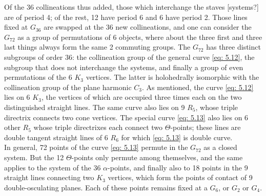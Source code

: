 \documentclass[leqno]{article}
\begin{document}
Of the 36 collineations thus added, those which interchange the staves [systems?] are of period 4; of the rest, 12 have period 6 and 6 have period 2. Those lines fixed at $G_{36}$ are swapped at the 36 new collineations, and one can consider the $G_{72}$ as a group of permutations of 6 objects, where about the three first and three last things always form the same 2 commuting groups. The $G_{72}$ has three distinct subgroups of order 36: the collineation group of the general curve \eqref{eq: 5.12}, the subgroup that does not interchange the systems, and finally a group of even permutations of the 6 $K_3$ vertices. The latter is holohedrally isomorphic with the collineation group of the plane harmonic $C_3$. As mentioned, the curve \eqref{eq: 5.12} lies on 6 $K_3$, the vertices of which are occupied three times each on the two distinguished straight lines. The same curve also lies on 9 $R_5$, whose triple directrix connects two cone vertices. The special curve \eqref{eq: 5.13} also lies on 6 other $R_5$ whose triple directrixes each connect two $\Theta$-points; these lines are double tangent straight lines of 6 $R_6$ for which \eqref{eq: 5.13} is double curve. \\
In general, 72 points of the curve \eqref{eq: 5.13} permute in the  $G_{72}$ as a closed system. But the 12 $\Theta$-points only permute among themselves, and the same applies to the system of the 36 $\alpha$-points, and finally also to 18 points in the 9 straight lines connecting two $K_3$ vertices, which form the points of contact of 9 double-osculating planes. Each of these points remains fixed at a $G_6$, or $G_2$ or $G_4$. 
\end{document}
